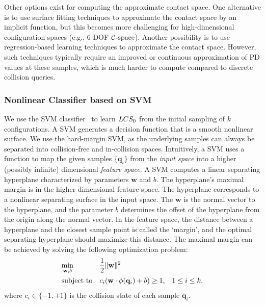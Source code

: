 Other options exist for computing the approximate contact space.
One alternative is to use surface fitting techniques to approximate the contact space by an implicit function, but this becomes more challenging for high-dimensional configuration spaces (e.g., 6-DOF $\mathcal C\text{-space}$). Another possibility is to use regression-based learning techniques to approximate the contact space. However, such techniques typically require an improved or continuous approximation of PD values at these samples, which is much harder to compute compared to discrete collision queries.

\subsubsection{Nonlinear Classifier based on SVM}
\label{sec:2:offline:svm}
We use the SVM classifier~\cite{Vapnik:1995:NSL} to learn $LCS_0$ from
the initial sampling of $k$ configurations.
A SVM generates a decision function that is a smooth nonlinear surface. We use the
hard-margin SVM, as the underlying samples can
always be separated into collision-free and in-collision spaces. Intuitively, a SVM 
uses a function to map the given samples $\{\mathbf q_i\}$ from the \emph{input space} into a higher (possibly infinite) dimensional \emph{feature space}.
A SVM computes a linear
separating hyperplane characterized by parameters $\mathbf w$ and $b$. The hyperplane's maximal margin
is in the higher dimensional feature space. The hyperplane corresponds to a nonlinear separating surface in the input space. The $\mathbf w$ is the normal vector to the hyperplane, and the
parameter $b$ determines the offset of the hyperplane from the
origin along the normal vector. In the feature space, the distance between a hyperplane and the closest sample point is
called the `margin', and the optimal separating hyperplane should maximize this distance.
The maximal margin can be achieved by solving the following
optimization problem:
\begin{align}
\label{eq:2:svm1}
& \underset{\mathbf w, b}{\text{min}} & & \frac{1}{2}\|\mathbf w\|^2 & &  \\
& \text{subject to} & & c_i (\mathbf w \cdot \phi(\mathbf q_i) + b)
\geq 1, & & 1 \leq i \leq k. \notag
\end{align}
where $c_i \in \{-1,+1\}$ is the collision state of each sample ${\mathbf q_i}$.

